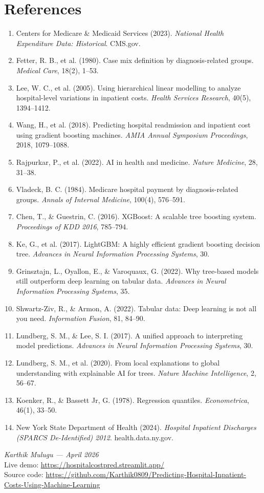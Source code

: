 \documentclass[11pt,a4paper]{article}
\begin{document}
\section*{References}
\begin{enumerate}
  \item Centers for Medicare \& Medicaid Services (2023). \textit{National Health Expenditure Data: Historical}. CMS.gov.
  \item Fetter, R. B., et al. (1980). Case mix definition by diagnosis-related groups. \textit{Medical Care}, 18(2), 1--53.
  \item Lee, W. C., et al. (2005). Using hierarchical linear modelling to analyze hospital-level variations in inpatient costs. \textit{Health Services Research}, 40(5), 1394--1412.
  \item Wang, H., et al. (2018). Predicting hospital readmission and inpatient cost using gradient boosting machines. \textit{AMIA Annual Symposium Proceedings}, 2018, 1079--1088.
  \item Rajpurkar, P., et al. (2022). AI in health and medicine. \textit{Nature Medicine}, 28, 31--38.
  \item Vladeck, B. C. (1984). Medicare hospital payment by diagnosis-related groups. \textit{Annals of Internal Medicine}, 100(4), 576--591.
  \item Chen, T., \& Guestrin, C. (2016). XGBoost: A scalable tree boosting system. \textit{Proceedings of KDD 2016}, 785--794.
  \item Ke, G., et al. (2017). LightGBM: A highly efficient gradient boosting decision tree. \textit{Advances in Neural Information Processing Systems}, 30.
  \item Grinsztajn, L., Oyallon, E., \& Varoquaux, G. (2022). Why tree-based models still outperform deep learning on tabular data. \textit{Advances in Neural Information Processing Systems}, 35.
  \item Shwartz-Ziv, R., \& Armon, A. (2022). Tabular data: Deep learning is not all you need. \textit{Information Fusion}, 81, 84--90.
  \item Lundberg, S. M., \& Lee, S. I. (2017). A unified approach to interpreting model predictions. \textit{Advances in Neural Information Processing Systems}, 30.
  \item Lundberg, S. M., et al. (2020). From local explanations to global understanding with explainable AI for trees. \textit{Nature Machine Intelligence}, 2, 56--67.
  \item Koenker, R., \& Bassett Jr, G. (1978). Regression quantiles. \textit{Econometrica}, 46(1), 33--50.
  \item New York State Department of Health (2024). \textit{Hospital Inpatient Discharges (SPARCS De-Identified) 2012}. health.data.ny.gov.
\end{enumerate}

\vspace{1em}
\begin{flushleft}
\textit{Karthik Mulugu --- April 2026}\\
Live demo: \url{https://hospitalcostpred.streamlit.app/}\\
Source code: \url{https://github.com/Karthik0809/Predicting-Hospital-Inpatient-Costs-Using-Machine-Learning}
\end{flushleft}
\end{document}
